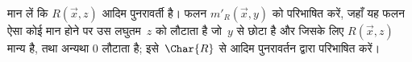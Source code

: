 \documentclass[../../../include/open-logic-section]{subfiles}
\begin{document}
\begin{prob}
मान लें कि $R(\vec x, z)$ आदिम पुनरावर्ती है। फलन $m'_R(\vec{x}, y)$
को परिभाषित करें, जहाँ यह फलन ऐसा कोई मान होने पर उस लघुतम~$z$ को लौटाता
है जो~$y$ से छोटा है और जिसके लिए $R(\vec{x}, z)$ मान्य है, तथा अन्यथा
$0$ लौटाता है; इसे~$\Char{R}$ से आदिम पुनरावर्तन द्वारा परिभाषित करें।
\end{prob}
\end{document}
